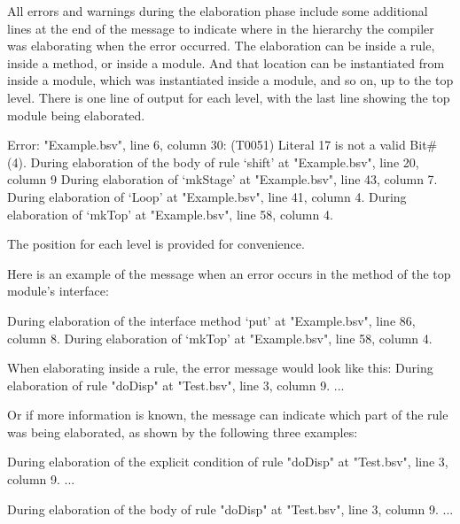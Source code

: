 \documentclass{article}
\newenvironment{centerboxverbatim}
  {\center
   \boxedverbatim}
  {\endboxedverbatim
  {\endcenter }}
\begin{document}
All errors and warnings during the elaboration phase include some
additional lines at the end of the message to indicate where in the
hierarchy the compiler was elaborating when the error occurred.  The
elaboration can be inside a rule, inside a method, or inside a
module.  And that location can be instantiated from inside a module,
which was instantiated inside a module, and so on,  up to the top level. 
There is one line of output for each level, with the last line showing
the top module being elaborated.  

\begin{centerboxverbatim}
Error: "Example.bsv", line 6, column 30: (T0051)
 Literal 17 is not a valid Bit#(4).
 During elaboration of the body of rule `shift' at "Example.bsv", line 20,
 column 9
 During elaboration of `mkStage' at "Example.bsv", line 43, column 7.
 During elaboration of `Loop' at "Example.bsv", line 41, column 4.
 During elaboration of `mkTop' at "Example.bsv", line 58, column 4.
\end{centerboxverbatim}

The position for each level is provided for convenience.

Here is an  example of  the message when an error occurs in the method of the top
module's interface:

\begin{centerboxverbatim}
During elaboration of the interface method `put' at "Example.bsv",
line 86, column 8.
During elaboration of `mkTop' at "Example.bsv", line 58, column 4.
\end{centerboxverbatim}

When elaborating inside a rule, the error message would look like this:
\begin{centerboxverbatim}
During elaboration of rule "doDisp" at "Test.bsv", line 3, column 9.
...
\end{centerboxverbatim}

Or if more information is known, the message can indicate which part
of the rule was being elaborated, as shown by the following three examples:

\begin{centerboxverbatim}
During elaboration of the explicit condition of rule "doDisp" at "Test.bsv",
  line 3, column 9.
...
\end{centerboxverbatim}

\begin{centerboxverbatim}
During elaboration of the body of rule "doDisp" at "Test.bsv", line 3,
  column 9.
...
\end{centerboxverbatim}
\end{document}

